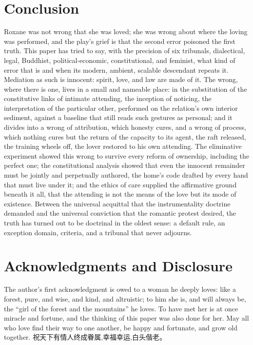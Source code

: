 \documentclass[11pt,a4paper]{article}
\begin{document}
\section{Conclusion}
\label{p02:sec:conclusion}

Roxane was not wrong that she was loved; she was wrong about where the loving was performed, and the play's grief is that the second error poisoned the first truth. This paper has tried to say, with the precision of six tribunals, dialectical, legal, Buddhist, political-economic, constitutional, and feminist, what kind of error that is and when its modern, ambient, scalable descendant repeats it. Mediation as such is innocent: spirit, love, and law are made of it. The wrong, where there is one, lives in a small and nameable place: in the substitution of the constitutive links of intimate attending, the inception of noticing, the interpretation of the particular other, performed on the relation's own interior sediment, against a baseline that still reads such gestures as personal; and it divides into a wrong of attribution, which honesty cures, and a wrong of process, which nothing cures but the return of the capacity to its agent, the raft released, the training wheels off, the lover restored to his own attending. The eliminative experiment showed this wrong to survive every reform of ownership, including the perfect one; the constitutional analysis showed that even the innocent remainder must be jointly and perpetually authored, the home's code drafted by every hand that must live under it; and the ethics of care supplied the affirmative ground beneath it all, that the attending is not the means of the love but its mode of existence. Between the universal acquittal that the instrumentality doctrine demanded and the universal conviction that the romantic protest desired, the truth has turned out to be doctrinal in the oldest sense: a default rule, an exception domain, criteria, and a tribunal that never adjourns.

\section*{Acknowledgments and Disclosure}

The author's first acknowledgment is owed to a woman he deeply loves: like a forest, pure, and wise, and kind, and altruistic; to him she is, and will always be, the ``girl of the forest and the mountains'' he loves. To have met her is at once miracle and fortune, and the thinking of this paper was also done for her. May all who love find their way to one another, be happy and fortunate, and grow old together. {\cjkfont 祝天下有情人终成眷属,幸福幸运,白头偕老。}
\end{document}
